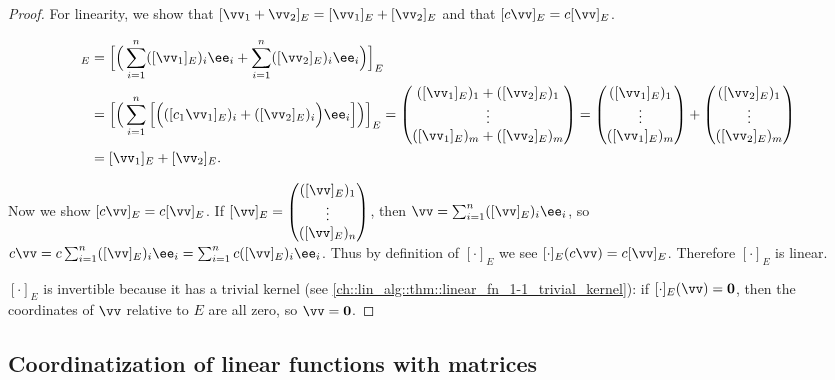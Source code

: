 \begin{proof}
    For linearity, we show that $[\vv_1 + \vv_2]_E = [\vv_1]_E + [\vv_2]_E$ and that $[c\vv]_E = c[\vv]_E$.
        
    \begin{align*}
        [\vv_1 + \vv_2]_E
        &= \Big[\Big(\sum_{i = 1}^n ([\vv_1]_E)_i \ee_i + \sum_{i = 1}^n ([\vv_2]_E)_i \ee_i\Big)\Big]_E \\
        &= \Big[\Big(\sum_{i = 1}^n \Big[ \Big(([c_1 \vv_1]_E)_i + ([\vv_2]_E)_i \Big) \ee_i \Big] \Big)\Big]_E
        = 
        \begin{pmatrix} ([\vv_1]_E)_1 + ([\vv_2]_E)_1 \\ \vdots \\ ([\vv_1]_E)_m + ([\vv_2]_E)_m \end{pmatrix}
        =
        \begin{pmatrix} ([\vv_1]_E)_1 \\ \vdots \\ ([\vv_1]_E)_m \end{pmatrix}
        +
        \begin{pmatrix} ([\vv_2]_E)_1 \\ \vdots \\ ([\vv_2]_E)_m \end{pmatrix} \\
        &= [\vv_1]_E + [\vv_2]_E.
    \end{align*}
        
    Now we show $[c \vv]_E = c [\vv]_E$. If $[\vv]_E = \begin{pmatrix} ([\vv]_E)_1 \\ \vdots \\ ([\vv]_E)_n \end{pmatrix}$, then $\vv = \sum_{i = 1}^n ([\vv]_E)_i \ee_i$, so $c \vv = c \sum_{i = 1}^n ([\vv]_E)_i \ee_i = \sum_{i = 1}^n c ([\vv]_E)_i \ee_i$. Thus by definition of $[\cdot]_E$ we see $[\cdot]_E(c \vv) = c [\vv]_E$. Therefore $[\cdot]_E$ is linear.
        
    $[\cdot]_E$ is invertible because it has a trivial kernel (see \ref{ch::lin_alg::thm::linear_fn_1-1_trivial_kernel}): if $[\cdot]_E(\vv) = \mathbf{0}$, then the coordinates of $\vv$ relative to $E$ are all zero, so $\vv = \mathbf{0}$.
\end{proof}

\newpage

\subsection*{Coordinatization of linear functions with matrices}

